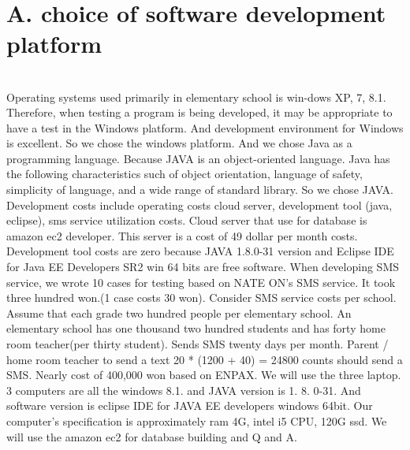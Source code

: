 \documentclass[a4paper,11pt]{IEEEtran}
\begin{document}
{\large
~\\
\section*{A. choice of software development platform}
~\\

Operating systems used primarily in elementary school is win-dows XP, 7, 8.1. Therefore, when testing a program is being developed, it may be appropriate to have a test in the Windows platform. And development environment for Windows is excellent. So we chose the windows platform. And we chose Java as a programming language. Because JAVA is an object-oriented language. Java has the following characteristics such of object orientation, language of safety, simplicity of language, and a wide range of standard library. So we chose  JAVA.
Development costs include operating costs cloud server, development tool (java, eclipse), sms service utilization costs.
Cloud server that use for database is amazon ec2 developer. 
This server is a cost of 49 dollar per month costs.
Development tool costs are zero because JAVA 1.8.0-31 version and Eclipse IDE for Java EE Developers SR2 win 64 bits are free software.
When developing SMS service, we wrote 10 cases for testing  based on NATE ON’s SMS service.
It took three hundred won.(1 case costs 30 won). Consider SMS service costs per school. Assume that each grade two hundred people per elementary school. An elementary school has one thousand two hundred students and has forty home room teacher(per thirty student). Sends SMS twenty days per month. Parent / home room teacher to send a text 20 * (1200 + 40) = 24800 counts should send a SMS. Nearly cost of 400,000 won based on ENPAX.
We will use the three laptop. 3 computers are all the windows 8.1. and JAVA version is 1. 8. 0-31. And software version is eclipse IDE for JAVA EE developers windows 64bit. Our computer’s specification is approximately ram 4G, intel i5 CPU, 120G ssd. We will use the amazon ec2 for database building and Q and A.
~\\
}
\end{document}
